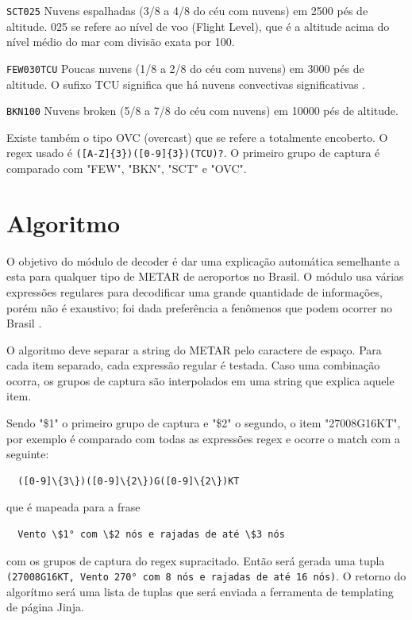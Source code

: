 \texttt{SCT025} Nuvens espalhadas (3/8 a 4/8 do céu com nuvens) em 2500 pés de altitude. 025 se refere ao nível 
de voo (Flight Level), que é a altitude acima do nível médio do mar com divisão exata por 100.

\texttt{FEW030TCU} Poucas nuvens (1/8 a 2/8 do céu com nuvens) em 3000 pés de altitude. O sufixo TCU significa 
que há nuvens convectivas significativas \cite{decea-mil}.

\texttt{BKN100} Nuvens broken (5/8 a 7/8 do céu com nuvens) em 10000 pés de altitude.

Existe também o tipo OVC (overcast) que se refere a totalmente encoberto. O regex usado é \verb|([A-Z]{3})([0-9]{3})(TCU)?|.
O primeiro grupo de captura é comparado com "FEW", "BKN", "SCT" e "OVC".

\section{Algoritmo}

O objetivo do módulo de decoder é dar uma explicação automática semelhante a esta para qualquer tipo de METAR de aeroportos 
no Brasil. O módulo usa várias expressões regulares para decodificar uma grande quantidade de informações, porém 
não é exaustivo; foi dada preferência a fenômenos que podem ocorrer no Brasil \cite{decea-mil}.

O algoritmo deve separar a string do METAR pelo caractere de espaço. Para cada item separado, cada expressão regular 
é testada. Caso uma combinação ocorra, os grupos de captura são interpolados em uma string que explica aquele item. 

Sendo "\$1" o primeiro grupo de captura e "\$2" o segundo, o item "27008G16KT", por exemplo é comparado com
todas as expressões regex e ocorre o match com a seguinte:

\begin{verbatim}
  ([0-9]\{3\})([0-9]\{2\})G([0-9]\{2\})KT
\end{verbatim}

que é mapeada para a frase

\begin{verbatim}
  Vento \$1° com \$2 nós e rajadas de até \$3 nós
\end{verbatim}

com os grupos de captura do regex supracitado. Então será gerada uma tupla
\texttt{(27008G16KT, Vento 270° com 8 nós e rajadas de até 16 nós)}. O retorno do 
algorítmo será uma lista de tuplas que será enviada a ferramenta de templating
de página Jinja.


